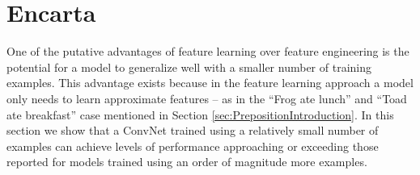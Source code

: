 
\section{Encarta}
\label{sec:PrepositionExperimentsEncarta}

One of the putative advantages of feature learning over feature engineering is the potential for a model to generalize well with a smaller number of training examples.  This advantage exists because in the feature learning approach a model only needs to learn approximate features -- as in the ``Frog ate lunch'' and ``Toad ate breakfast'' case mentioned in Section \ref{sec:PrepositionIntroduction}.  In this section we show that a ConvNet trained using a relatively small number of examples can achieve levels of performance approaching or exceeding those reported for models trained using an order of magnitude more examples.

